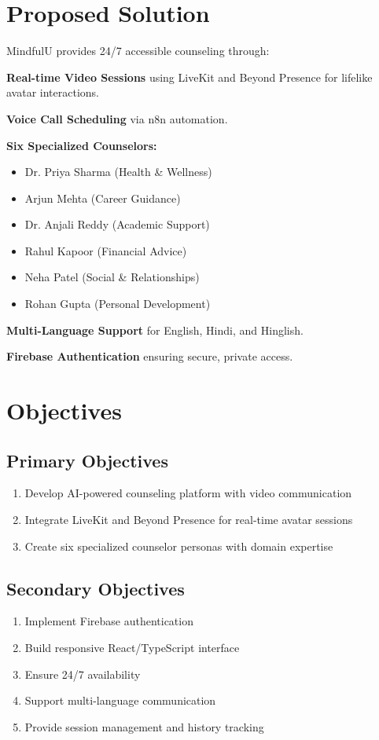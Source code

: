 \documentclass[11pt,a4paper]{report}
\begin{document}
\section{Proposed Solution}
MindfulU provides 24/7 accessible counseling through:

\textbf{Real-time Video Sessions} using LiveKit and Beyond Presence for lifelike avatar interactions.

\textbf{Voice Call Scheduling} via n8n automation.

\textbf{Six Specialized Counselors:}
\begin{itemize}
    \item Dr. Priya Sharma (Health \& Wellness)
    \item Arjun Mehta (Career Guidance)
    \item Dr. Anjali Reddy (Academic Support)
    \item Rahul Kapoor (Financial Advice)
    \item Neha Patel (Social \& Relationships)
    \item Rohan Gupta (Personal Development)
\end{itemize}

\textbf{Multi-Language Support} for English, Hindi, and Hinglish.

\textbf{Firebase Authentication} ensuring secure, private access.

\section{Objectives}

\subsection{Primary Objectives}
\begin{enumerate}
    \item Develop AI-powered counseling platform with video communication
    \item Integrate LiveKit and Beyond Presence for real-time avatar sessions
    \item Create six specialized counselor personas with domain expertise
\end{enumerate}

\subsection{Secondary Objectives}
\begin{enumerate}
    \item Implement Firebase authentication
    \item Build responsive React/TypeScript interface
    \item Ensure 24/7 availability
    \item Support multi-language communication
    \item Provide session management and history tracking
\end{enumerate}
\end{document}
